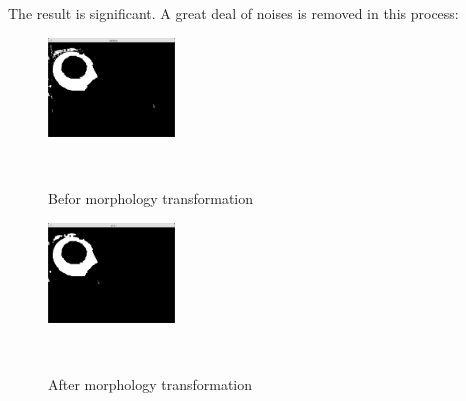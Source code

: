 The result is significant. A great deal of noises is removed in this process:\\
\begin{figure}[h!]

  \centering
    \includegraphics[width=0.3\textwidth]{../Pictures/before.png}
    \caption{Befor morphology transformation}\\
\end{figure}
\begin{figure}[h!]

  \centering
    \includegraphics[width=0.3\textwidth]{../Pictures/after.png}
    \caption{After morphology transformation}\\
\end{figure}
